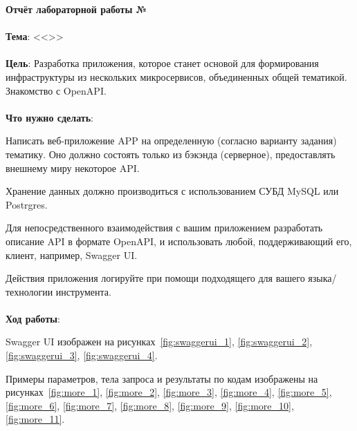 \documentclass[12pt, a4paper, simple]{eskdtext}
\begin{document}
  

  \begin{center}
    \textbf{Отчёт лабораторной работы №\envReportLabNumber}
  \end{center}

  \paragraph{} \textbf{Тема}: <<\envReportTitle>>

  \paragraph{} \textbf{Цель}:
  Разработка приложения, которое станет основой для формирования инфраструктуры из нескольких микросервисов,
  объединенных общей тематикой.
  Знакомство с OpenAPI.

  \paragraph{} \textbf{Что нужно сделать}:

  Написать веб-приложение APP на определенную (согласно варианту задания) тематику.
  Оно должно состоять только из бэкэнда (серверное), предоставлять внешнему миру некоторое API. 

  Хранение данных должно производиться с использованием СУБД MySQL или Postrgres.

  Для непосредственного взаимодействия с вашим приложением разработать описание API в формате OpenAPI,
  и использовать любой, поддерживающий его, клиент, например, Swagger UI.

  Действия приложения логируйте при помощи подходящего для вашего языка/технологии инструмента.

  \paragraph{} \textbf{Ход работы}:

  Swagger UI изображен на рисунках~\ref{fig:swaggerui_1}, \ref{fig:swaggerui_2}, \ref{fig:swaggerui_3}, \ref{fig:swaggerui_4}.

  Примеры параметров, тела запроса и результаты по кодам изображены на рисунках~\ref{fig:more_1},
  \ref{fig:more_2}, \ref{fig:more_3}, \ref{fig:more_4}, \ref{fig:more_5}, \ref{fig:more_6},
  \ref{fig:more_7}, \ref{fig:more_8}, \ref{fig:more_9}, \ref{fig:more_10}, \ref{fig:more_11}.
\end{document}
